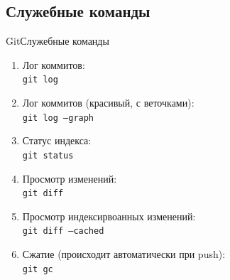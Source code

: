 \documentclass[10pt]{beamer}
\begin{document}
\subsection{Служебные команды}
\begin{frame}[fragile]{Git}{Служебные команды}
\begin{enumerate}
\item Лог коммитов:\\
\texttt{git log}\\

\item Лог коммитов (красивый, с веточками):\\
\texttt{git log ---graph}\\

\item Статус индекса:\\
\texttt{git status}\\

\item Просмотр изменений:\\
\texttt{git diff}\\

\item Просмотр индексирвоанных изменений:\\
\texttt{git diff ---cached}\\

\item Сжатие (происходит автоматически при push):\\
\texttt{git gc}\\

\end{enumerate}
\end{frame}
\end{document}
